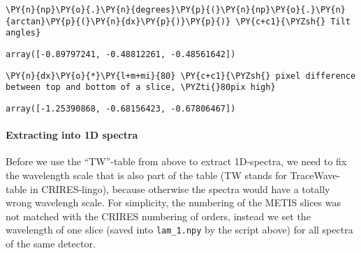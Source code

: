 \begin{tcolorbox}[breakable, size=fbox, boxrule=1pt, pad at break*=1mm,colback=cellbackground, colframe=cellborder]
\begin{Verbatim}[commandchars=\\\{\}]
\PY{n}{np}\PY{o}{.}\PY{n}{degrees}\PY{p}{(}\PY{n}{np}\PY{o}{.}\PY{n}{arctan}\PY{p}{(}\PY{n}{dx}\PY{p}{)}\PY{p}{)} \PY{c+c1}{\PYZsh{} Tilt angles}
\end{Verbatim}
\end{tcolorbox}

\begin{tcolorbox}[breakable, size=fbox, boxrule=.5pt, pad at break*=1mm, opacityfill=0]
\begin{Verbatim}[commandchars=\\\{\}]
array([-0.89797241, -0.48812261, -0.48561642])
\end{Verbatim}
\end{tcolorbox}

\begin{tcolorbox}[breakable, size=fbox, boxrule=1pt, pad at break*=1mm,colback=cellbackground, colframe=cellborder]
\begin{Verbatim}[commandchars=\\\{\}]
\PY{n}{dx}\PY{o}{*}\PY{l+m+mi}{80} \PY{c+c1}{\PYZsh{} pixel difference between top and bottom of a slice, \PYZti{}80pix high}
\end{Verbatim}
\end{tcolorbox}

\begin{tcolorbox}[breakable, size=fbox, boxrule=.5pt, pad at break*=1mm, opacityfill=0]
\begin{Verbatim}[commandchars=\\\{\}]
array([-1.25390868, -0.68156423, -0.67806467])
\end{Verbatim}
\end{tcolorbox}

\paragraph{Extracting into 1D spectra}
Before we use the ``TW''-table from above to extract 1D-spectra, we need
to fix the wavelength scale that is also part of the table (TW stands
for TraceWave-table in CRIRES-lingo), because otherwise the spectra
would have a totally wrong wavelengh scale. For simplicity, the
numbering of the METIS slices was not matched with the CRIRES numbering
of orders, instead we set the wavelength of one slice (saved into
\texttt{lam\_1.npy} by the script above) for all spectra of the same
detector.

